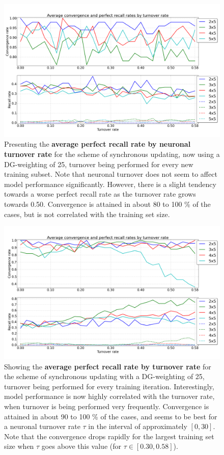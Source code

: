 \begin{figure}
    \centering
    \includegraphics[width=13cm]{fig/turnover_rates/sync_tm0_dgw25}
    \caption{Presenting the \textbf{average perfect recall rate by neuronal turnover rate} for the scheme of synchronous updating, now using a DG-weighting of 25, turnover being performed for every new training subset. Note that neuronal turnover does not seem to affect model performance significantly. However, there is a slight tendency towards a worse perfect recall rate as the turnover rate grows towards 0.50.
    Convergence is attained in about 80 to 100 \% of the cases, but is not correlated with the training set size.}
    \label{fig:sync_tm0_dgw25}
\end{figure}

\begin{figure}
    \centering
    \includegraphics[width=13cm]{fig/turnover_rates/sync_tm1_dgw25}
    \caption{Showing the \textbf{average perfect recall rate by turnover rate} for the scheme of synchronous updating with a DG-weighting of 25, turnover being performed for every training iteration. Interestingly, model performance is now highly correlated with the turnover rate, when turnover is being performed very frequently.
    Convergence is attained in about 90 to 100 \% of the cases, and seems to be best for a neuronal turnover rate $\tau$ in the interval of approximately $[0, 30]$. Note that the convergence drops rapidly for the largest training set size when $\tau$ goes above this value (for $\tau \in [0.30, 0.58]$).}
    \label{fig:sync_tm1_dgw25}
\end{figure}

